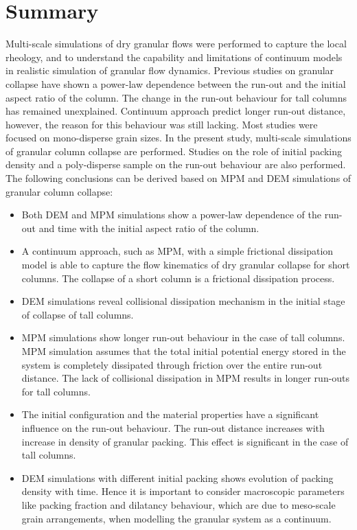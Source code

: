 \clearpage

\section{Summary}

Multi-scale simulations of dry granular flows were performed to capture the 
local rheology, and to understand the capability and limitations of continuum 
models in realistic simulation of granular flow dynamics. Previous studies on 
granular collapse have shown a power-law dependence between the run-out and the 
initial aspect ratio of the column. The change in the run-out behaviour for 
tall columns has remained unexplained. Continuum approach predict longer 
run-out distance, however, the reason for this behaviour was still lacking. 
Most studies were focused on mono-disperse grain sizes. In the present study, 
multi-scale simulations of granular column collapse are performed. Studies on 
the role of initial packing density and a poly-disperse sample on the run-out 
behaviour are also performed. The following conclusions can be derived based on 
MPM and DEM simulations of granular column collapse:

\begin{itemize}

\item Both DEM and MPM simulations show a power-law dependence of the run-out 
and time with the initial aspect ratio of the column. 

\item A continuum approach, such as MPM, with a simple frictional dissipation 
model is able to capture the flow kinematics of dry granular collapse for short 
columns. The collapse of a short column is a frictional dissipation process.

\item DEM simulations reveal collisional dissipation mechanism in the initial 
stage of collapse of tall columns. 

\item MPM simulations show longer run-out behaviour in the case 
of tall columns. MPM simulation assumes that the total initial potential energy 
stored in the system is completely dissipated through friction over the entire 
run-out distance. The lack of collisional dissipation in MPM results in longer 
run-outs for tall columns.

\item  The initial configuration and the material properties have a significant 
influence on the run-out behaviour. The run-out distance increases with 
increase in density of granular packing. This effect is significant in the case 
of tall columns. 

\item DEM simulations with different initial packing shows evolution of packing 
density with time.  Hence it is important to consider macroscopic parameters 
like packing fraction and dilatancy behaviour, which are due to meso-scale 
grain arrangements, when modelling the granular system as a continuum.
\end{itemize}

